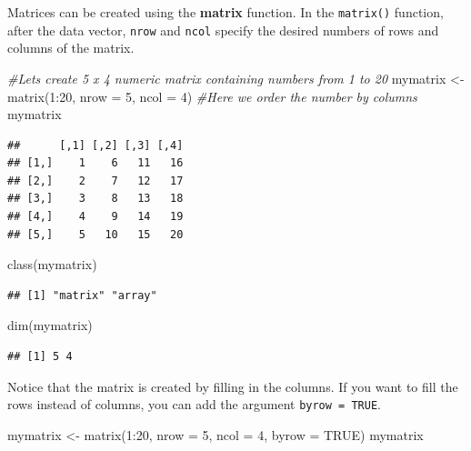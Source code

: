 \documentclass[
]{book}
\newenvironment{Shaded}{\begin{snugshade}}{\end{snugshade}}
\newcommand{\AttributeTok}[1]{\textcolor[rgb]{0.77,0.63,0.00}{#1}}
\newcommand{\CommentTok}[1]{\textcolor[rgb]{0.56,0.35,0.01}{\textit{#1}}}
\newcommand{\ConstantTok}[1]{\textcolor[rgb]{0.00,0.00,0.00}{#1}}
\newcommand{\DecValTok}[1]{\textcolor[rgb]{0.00,0.00,0.81}{#1}}
\newcommand{\FunctionTok}[1]{\textcolor[rgb]{0.00,0.00,0.00}{#1}}
\newcommand{\NormalTok}[1]{#1}
\newcommand{\OtherTok}[1]{\textcolor[rgb]{0.56,0.35,0.01}{#1}}
\newcommand{\SpecialCharTok}[1]{\textcolor[rgb]{0.00,0.00,0.00}{#1}}
\begin{document}
Matrices can be created using the \textbf{matrix} function. In the \texttt{matrix()} function, after the data vector, \texttt{nrow} and \texttt{ncol} specify the desired numbers of rows and columns of the matrix.

\begin{Shaded}
\begin{Highlighting}[]
\CommentTok{\#Let\textquotesingle{}s create 5 x 4 numeric matrix containing numbers from 1 to 20}
\NormalTok{mymatrix }\OtherTok{\textless{}{-}} \FunctionTok{matrix}\NormalTok{(}\DecValTok{1}\SpecialCharTok{:}\DecValTok{20}\NormalTok{, }\AttributeTok{nrow =} \DecValTok{5}\NormalTok{, }\AttributeTok{ncol =} \DecValTok{4}\NormalTok{)  }\CommentTok{\#Here we order the number by columns}
\NormalTok{mymatrix}
\end{Highlighting}
\end{Shaded}

\begin{verbatim}
##      [,1] [,2] [,3] [,4]
## [1,]    1    6   11   16
## [2,]    2    7   12   17
## [3,]    3    8   13   18
## [4,]    4    9   14   19
## [5,]    5   10   15   20
\end{verbatim}

\begin{Shaded}
\begin{Highlighting}[]
\FunctionTok{class}\NormalTok{(mymatrix)}
\end{Highlighting}
\end{Shaded}

\begin{verbatim}
## [1] "matrix" "array"
\end{verbatim}

\begin{Shaded}
\begin{Highlighting}[]
\FunctionTok{dim}\NormalTok{(mymatrix)}
\end{Highlighting}
\end{Shaded}

\begin{verbatim}
## [1] 5 4
\end{verbatim}

Notice that the matrix is created by filling in the columns. If you want to fill the rows instead of columns, you can add the argument \texttt{byrow\ =\ TRUE}.

\begin{Shaded}
\begin{Highlighting}[]
\NormalTok{mymatrix }\OtherTok{\textless{}{-}} \FunctionTok{matrix}\NormalTok{(}\DecValTok{1}\SpecialCharTok{:}\DecValTok{20}\NormalTok{, }\AttributeTok{nrow =} \DecValTok{5}\NormalTok{, }\AttributeTok{ncol =} \DecValTok{4}\NormalTok{, }\AttributeTok{byrow =} \ConstantTok{TRUE}\NormalTok{)}
\NormalTok{mymatrix}
\end{Highlighting}
\end{Shaded}
\end{document}
